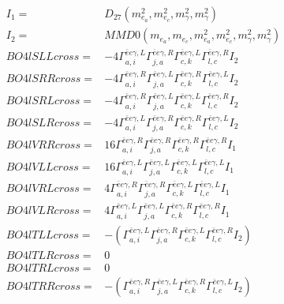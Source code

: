 \documentclass[A4,landscape]{article}
\begin{document}
\begin{align} 
I_1 = & D_{27}(m^2_{e_{{a}}}, m^2_{e_{{c}}}, m^2_{\gamma}, m^2_{\gamma}) \\ 
I_2 = & MMD0(m_{e_{{a}}}, m_{e_{{c}}}, m^2_{e_{{a}}}, m^2_{e_{{c}}}, m^2_{\gamma}, m^2_{\gamma}) \\ 
  BO4lSLLcross= & -4  \Gamma^{\bar{e}e \gamma ,L}_{a, i} \Gamma^{\bar{e}e \gamma ,R}_{j, a} \Gamma^{\bar{e}e \gamma ,L}_{c, k} \Gamma^{\bar{e}e \gamma ,R}_{l, c} I_2 \\ 
  BO4lSRRcross= & -4  \Gamma^{\bar{e}e \gamma ,R}_{a, i} \Gamma^{\bar{e}e \gamma ,L}_{j, a} \Gamma^{\bar{e}e \gamma ,R}_{c, k} \Gamma^{\bar{e}e \gamma ,L}_{l, c} I_2 \\ 
  BO4lSRLcross= & -4  \Gamma^{\bar{e}e \gamma ,R}_{a, i} \Gamma^{\bar{e}e \gamma ,L}_{j, a} \Gamma^{\bar{e}e \gamma ,L}_{c, k} \Gamma^{\bar{e}e \gamma ,R}_{l, c} I_2 \\ 
  BO4lSLRcross= & -4  \Gamma^{\bar{e}e \gamma ,L}_{a, i} \Gamma^{\bar{e}e \gamma ,R}_{j, a} \Gamma^{\bar{e}e \gamma ,R}_{c, k} \Gamma^{\bar{e}e \gamma ,L}_{l, c} I_2 \\ 
  BO4lVRRcross= & 16  \Gamma^{\bar{e}e \gamma ,R}_{a, i} \Gamma^{\bar{e}e \gamma ,R}_{j, a} \Gamma^{\bar{e}e \gamma ,R}_{c, k} \Gamma^{\bar{e}e \gamma ,R}_{l, c} I_1 \\ 
  BO4lVLLcross= & 16  \Gamma^{\bar{e}e \gamma ,L}_{a, i} \Gamma^{\bar{e}e \gamma ,L}_{j, a} \Gamma^{\bar{e}e \gamma ,L}_{c, k} \Gamma^{\bar{e}e \gamma ,L}_{l, c} I_1 \\ 
  BO4lVRLcross= & 4  \Gamma^{\bar{e}e \gamma ,R}_{a, i} \Gamma^{\bar{e}e \gamma ,R}_{j, a} \Gamma^{\bar{e}e \gamma ,L}_{c, k} \Gamma^{\bar{e}e \gamma ,L}_{l, c} I_1 \\ 
  BO4lVLRcross= & 4  \Gamma^{\bar{e}e \gamma ,L}_{a, i} \Gamma^{\bar{e}e \gamma ,L}_{j, a} \Gamma^{\bar{e}e \gamma ,R}_{c, k} \Gamma^{\bar{e}e \gamma ,R}_{l, c} I_1 \\ 
  BO4lTLLcross= & -( \Gamma^{\bar{e}e \gamma ,L}_{a, i} \Gamma^{\bar{e}e \gamma ,R}_{j, a} \Gamma^{\bar{e}e \gamma ,L}_{c, k} \Gamma^{\bar{e}e \gamma ,R}_{l, c} I_2) \\ 
  BO4lTLRcross= & 0 \\ 
  BO4lTRLcross= & 0 \\ 
  BO4lTRRcross= & -( \Gamma^{\bar{e}e \gamma ,R}_{a, i} \Gamma^{\bar{e}e \gamma ,L}_{j, a} \Gamma^{\bar{e}e \gamma ,R}_{c, k} \Gamma^{\bar{e}e \gamma ,L}_{l, c} I_2) \\ 
\end{align} 
\end{document}
